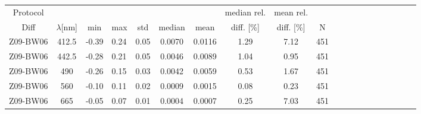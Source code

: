 \documentclass[preview]{standalone}
\begin{document}
\footnotesize
\centering
\setlength\tabcolsep{3pt} %
\begin{table}
\begin{tabular}{@{\extracolsep{4pt}}ScSlScScScScScScScSc @{}}
\hline
Protocol & & & & & & & median rel. & mean rel. & \\
Diff & $\lambda$[nm] & min & max & std & median & mean & diff. [\%] & diff. [\%] & N\\ \hline
Z09-BW06 & 412.5 & -0.39 & 0.24 & 0.05 & 0.0070 & 0.0116 & 1.29 & 7.12 & 451\\
Z09-BW06 & 442.5 & -0.28 & 0.21 & 0.05 & 0.0046 & 0.0089 & 1.04 & 0.95 & 451\\
Z09-BW06 & 490   & -0.26 & 0.15 & 0.03 & 0.0042 & 0.0059 & 0.53 & 1.67 & 451\\
Z09-BW06 & 560   & -0.10 & 0.11 & 0.02 & 0.0009 & 0.0015 & 0.08 & 0.23 & 451\\
Z09-BW06 & 665   & -0.05 & 0.07 & 0.01 & 0.0004 & 0.0007 & 0.25 & 7.03 & 451\\\hline


\end{tabular}
\end{table}
\end{document}
